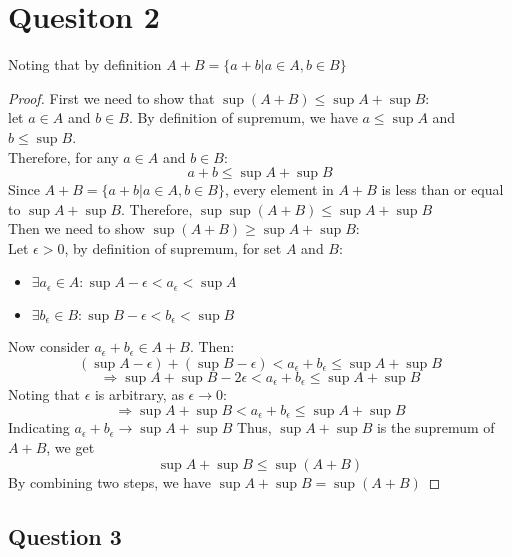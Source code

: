 \documentclass{article}
\begin{document}
\section*{Quesiton 2}
Noting that by definition \( A + B = \{ a + b | a \in A, b \in B \} \)

\begin{proof}
    First we need to show that \( \sup(A + B) \leq \sup A + \sup B \):
    \\
    let $a \in A$ and $b \in B$. By definition of supremum, we have $a \leq \sup A$ and $b \leq \sup B$.
    \\
    Therefore, for any $a \in A$ and $b \in B$:
    \[ a + b \leq \sup A + \sup B \]
    Since \( A + B = \{ a + b | a \in A, b \in B \} \), every element in $A + B$ is less than or equal to $\sup A + \sup B$.
    Therefore, \( \sup \sup(A + B) \leq \sup A + \sup B \)
    \\
    Then we need to show \( \sup(A + B) \geq \sup A + \sup B \):
    \\
    Let $\epsilon > 0$, by definition of supremum, for set $A$ and $B$:
    \begin{itemize}
        \item \( \exists a_{\epsilon} \in A : \sup A - \epsilon < a_{\epsilon} < \sup A \)
        \item \( \exists b_{\epsilon} \in B : \sup B - \epsilon < b_{\epsilon} < \sup B \)
    \end{itemize}
    Now consider $a_{\epsilon} + b_{\epsilon} \in A + B$. Then:
    \[ (\sup A - \epsilon) + (\sup B - \epsilon) < a_{\epsilon} + b_{\epsilon} \leq \sup A + \sup B \]
    \[ \Rightarrow \sup A + \sup B - 2 \epsilon < a_{\epsilon} + b_{\epsilon} \leq \sup A + \sup B \]
    Noting that $\epsilon$ is arbitrary, as $\epsilon \rightarrow 0$:
    \[ \Rightarrow \sup A + \sup B < a_{\epsilon} + b_{\epsilon} \leq \sup A + \sup B \]
    Indicating $a_{\epsilon} + b_{\epsilon} \rightarrow \sup A + \sup B$
    Thus, $\sup A + \sup B$ is the supremum of $A + B$, we get
    \[ \sup A + \sup B \leq \sup (A + B) \]
    By combining two steps, we have $\sup A + \sup B = \sup (A + B)$
\end{proof}

\subsection*{Question 3}
\end{document}
